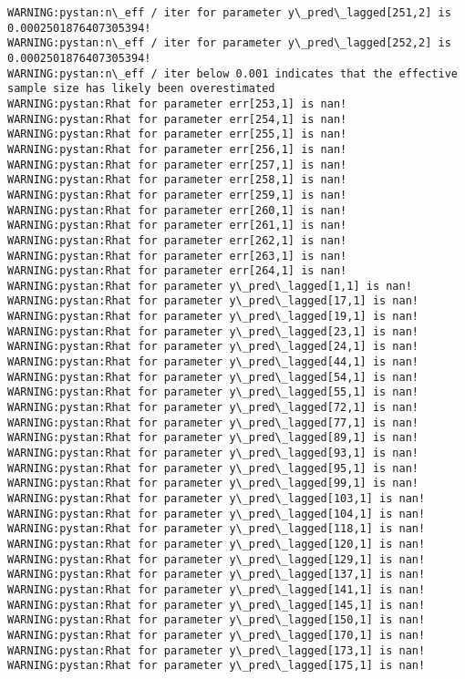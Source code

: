 \documentclass[11pt]{article}
\begin{document}
\begin{Verbatim}[commandchars=\\\{\}]
WARNING:pystan:n\_eff / iter for parameter y\_pred\_lagged[251,2] is 0.0002501876407305394!
WARNING:pystan:n\_eff / iter for parameter y\_pred\_lagged[252,2] is 0.0002501876407305394!
WARNING:pystan:n\_eff / iter below 0.001 indicates that the effective sample size has likely been overestimated
WARNING:pystan:Rhat for parameter err[253,1] is nan!
WARNING:pystan:Rhat for parameter err[254,1] is nan!
WARNING:pystan:Rhat for parameter err[255,1] is nan!
WARNING:pystan:Rhat for parameter err[256,1] is nan!
WARNING:pystan:Rhat for parameter err[257,1] is nan!
WARNING:pystan:Rhat for parameter err[258,1] is nan!
WARNING:pystan:Rhat for parameter err[259,1] is nan!
WARNING:pystan:Rhat for parameter err[260,1] is nan!
WARNING:pystan:Rhat for parameter err[261,1] is nan!
WARNING:pystan:Rhat for parameter err[262,1] is nan!
WARNING:pystan:Rhat for parameter err[263,1] is nan!
WARNING:pystan:Rhat for parameter err[264,1] is nan!
WARNING:pystan:Rhat for parameter y\_pred\_lagged[1,1] is nan!
WARNING:pystan:Rhat for parameter y\_pred\_lagged[17,1] is nan!
WARNING:pystan:Rhat for parameter y\_pred\_lagged[19,1] is nan!
WARNING:pystan:Rhat for parameter y\_pred\_lagged[23,1] is nan!
WARNING:pystan:Rhat for parameter y\_pred\_lagged[24,1] is nan!
WARNING:pystan:Rhat for parameter y\_pred\_lagged[44,1] is nan!
WARNING:pystan:Rhat for parameter y\_pred\_lagged[54,1] is nan!
WARNING:pystan:Rhat for parameter y\_pred\_lagged[55,1] is nan!
WARNING:pystan:Rhat for parameter y\_pred\_lagged[72,1] is nan!
WARNING:pystan:Rhat for parameter y\_pred\_lagged[77,1] is nan!
WARNING:pystan:Rhat for parameter y\_pred\_lagged[89,1] is nan!
WARNING:pystan:Rhat for parameter y\_pred\_lagged[93,1] is nan!
WARNING:pystan:Rhat for parameter y\_pred\_lagged[95,1] is nan!
WARNING:pystan:Rhat for parameter y\_pred\_lagged[99,1] is nan!
WARNING:pystan:Rhat for parameter y\_pred\_lagged[103,1] is nan!
WARNING:pystan:Rhat for parameter y\_pred\_lagged[104,1] is nan!
WARNING:pystan:Rhat for parameter y\_pred\_lagged[118,1] is nan!
WARNING:pystan:Rhat for parameter y\_pred\_lagged[120,1] is nan!
WARNING:pystan:Rhat for parameter y\_pred\_lagged[129,1] is nan!
WARNING:pystan:Rhat for parameter y\_pred\_lagged[137,1] is nan!
WARNING:pystan:Rhat for parameter y\_pred\_lagged[141,1] is nan!
WARNING:pystan:Rhat for parameter y\_pred\_lagged[145,1] is nan!
WARNING:pystan:Rhat for parameter y\_pred\_lagged[150,1] is nan!
WARNING:pystan:Rhat for parameter y\_pred\_lagged[170,1] is nan!
WARNING:pystan:Rhat for parameter y\_pred\_lagged[173,1] is nan!
WARNING:pystan:Rhat for parameter y\_pred\_lagged[175,1] is nan!

\end{Verbatim}
\end{document}
